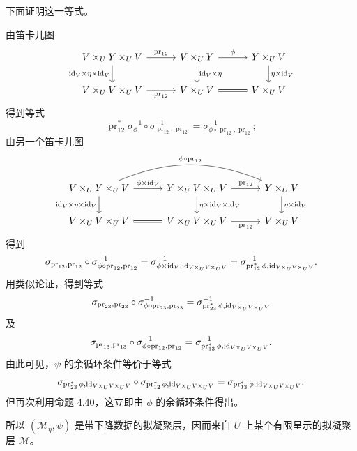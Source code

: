 下面证明这一等式。

由笛卡儿图
\[
\begin{tikzcd}[column sep=3em]
 V\times_U Y\times_U V\arrow[r,"{\operatorname{pr}_{12}}"]\arrow[d,"{\id_V\times\eta\times\id_V}"']&V\times_U Y\arrow[r,"{\phi}"]\arrow[d,"{\id_V\times\eta}"]&Y\times_U V\arrow[d,"{\eta\times\id_V}"]\\
 V\times_U V\times_U V\arrow[r,"{\operatorname{pr}_{12}}"']&V\times_U V\arrow[r,equal]&V\times_U V
\end{tikzcd}
\]
得到等式
\[
 \operatorname{pr}_{12}^*\sigma_\phi^{-1}\circ\sigma_{\operatorname{pr}_{12},\operatorname{pr}_{12}}^{-1}
 =\sigma_{\phi\circ\operatorname{pr}_{12},\operatorname{pr}_{12}}^{-1};
\]
由另一个笛卡儿图
\[
\begin{tikzcd}[column sep=3em]
 V\times_U Y\times_U V\arrow[r,"{\phi\times\id_V}"]\arrow[rr,bend left=22,"{\phi\circ\operatorname{pr}_{12}}"]\arrow[d,"{\id_V\times\eta\times\id_V}"']&Y\times_U V\times_U V\arrow[r,"{\operatorname{pr}_{12}}"]\arrow[d,"{\eta\times\id_V\times\id_V}"]&Y\times_U V\arrow[d,"{\eta\times\id_V}"]\\
 V\times_U V\times_U V\arrow[r,equal]&V\times_U V\times_U V\arrow[r,"{\operatorname{pr}_{12}}"']&V\times_U V
\end{tikzcd}
\]
得到
\[
 \sigma_{\operatorname{pr}_{12},\operatorname{pr}_{12}}
 \circ\sigma_{\phi\circ\operatorname{pr}_{12},\operatorname{pr}_{12}}^{-1}
 =\sigma_{\phi\times\mathrm{id}_V,\mathrm{id}_{V\times_U V\times_U V}}^{-1}
 =\sigma_{\operatorname{pr}_{12}^*\phi,\mathrm{id}_{V\times_U V\times_U V}}^{-1}.
\]
用类似论证，得到等式
\[
 \sigma_{\operatorname{pr}_{23},\operatorname{pr}_{23}}
 \circ\sigma_{\phi\circ\operatorname{pr}_{23},\operatorname{pr}_{23}}^{-1}
 =\sigma_{\operatorname{pr}_{23}^*\phi,\mathrm{id}_{V\times_U V\times_U V}}^{-1}
\]
及
\[
 \sigma_{\operatorname{pr}_{13},\operatorname{pr}_{13}}
 \circ\sigma_{\phi\circ\operatorname{pr}_{13},\operatorname{pr}_{13}}^{-1}
 =\sigma_{\operatorname{pr}_{13}^*\phi,\mathrm{id}_{V\times_U V\times_U V}}^{-1}.
\]
由此可见，$\psi$ 的余循环条件等价于等式
\[
 \sigma_{\operatorname{pr}_{23}^*\phi,\mathrm{id}_{V\times_U V\times_U V}}
 \circ\sigma_{\operatorname{pr}_{12}^*\phi,\mathrm{id}_{V\times_U V\times_U V}}
 =\sigma_{\operatorname{pr}_{13}^*\phi,\mathrm{id}_{V\times_U V\times_U V}}.
\]
但再次利用命题 4.40，这立即由 $\phi$ 的余循环条件得出。

所以 $(\mathcal M_\eta,\psi)$ 是带下降数据的拟凝聚层，因而来自 $U$ 上某个有限呈示的拟凝聚层 $\mathcal M$。


